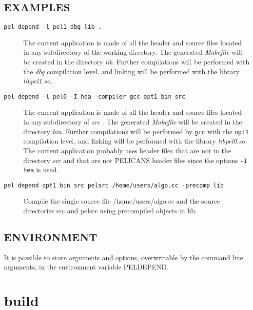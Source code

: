 \documentclass{article}
\begin{document}
\subsection*{EXAMPLES\label{depend_EXAMPLES}}
\begin{description}

\item[\texttt{pel depend -l pel1 dbg lib .}] \mbox{}

The current application is made of all the header and source files
located in any subdirectory of the working directory. 
The generated \emph{Makefile} will be created
in the directory \emph{lib}. Further compilations will be performed with the
\emph{dbg} compilation level, and linking will be performed with the library
\emph{libpel1.so}.


\item[\texttt{pel depend -l pel0 -I hea -compiler gcc opt1 bin src}] \mbox{}

The current application is made of all the header and source files
located in any subdirectory of \emph{src} . The generated \emph{Makefile} will be
created in the directory \emph{bin}. Further compilations will be performed
by \texttt{gcc} with the \texttt{opt1} compilation level, and linking will be performed
with the library \emph{libpel0.so}. The current application probably uses header
files that are not in the directory \emph{src} and that are not PELICANS header
files since the options \texttt{-I hea} is used.


\item[\texttt{pel depend opt1 bin src pelsrc /home/users/algo.cc -precomp lib}] \mbox{}

Compile the single source file /home/users/algo.cc and the source directories src and pelsrc using precompiled objects in lib.

\end{description}
\subsection*{ENVIRONMENT\label{depend_ENVIRONMENT}}


It is possible to store arguments and options, overwritable by the command
line arguments, in the environment variable PELDEPEND.

\clearpage
\section{build\label{build}}
\end{document}
